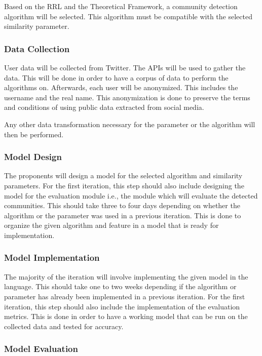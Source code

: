 Based on the RRL and the Theoretical Framework, a community detection algorithm will be selected. This algorithm must be compatible with the selected similarity parameter.


\subsubsection{Data Collection}


User data will be collected from Twitter. The API\vtick s will be used to gather the data. This will be done in order to have a corpus of data to perform the algorithms on. Afterwards, each user will be anonymized. This includes the username and the real name.  This anonymization is done to preserve the terms and conditions of using public data extracted from social media. 


Any other data transformation necessary for the parameter or the algorithm will then be performed.


\subsubsection{Model Design}


The proponents will design a model for the selected algorithm and similarity parameters. For the first iteration, this step should also include designing the model for the evaluation module i.e., the module which will evaluate the detected communities. This should take three to four days depending on whether the algorithm or the parameter was used in a previous iteration. This is done to organize the given algorithm and feature in a model that is ready for implementation.


\subsubsection{Model Implementation}


The majority of the iteration will involve implementing the given model in the language. This should take one to two weeks depending if the algorithm or parameter has already been implemented in a previous iteration. For the first iteration, this step should also include the implementation of the evaluation metrics. This is done in order to have a working model that can be run on the collected data and tested for accuracy.


\subsubsection{Model Evaluation}


